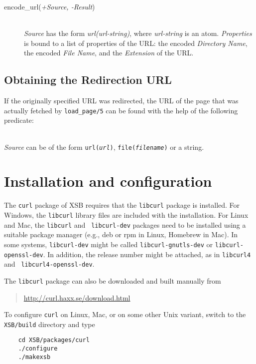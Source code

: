 \begin{description}
\item[encode\_url({\it +Source, -Result})]\mbox{}
  \\
{\it Source} has the form {\it url(url-string)}, where
\emph{url-string} is an atom.
{\it Properties} is bound to a list of properties of the URL:
the encoded {\it Directory Name}, the encoded {\it File Name}, and the {\it
  Extension} of the URL.

\end{description}

\subsection{Obtaining the Redirection URL}

If the originally specified URL was redirected, the URL of the page that
was actually fetched by {\tt load\_page/5} can be found with the help of
the following predicate: 

\begin{description}
\item[get\_redir\_url({\it +Source, -UrlNew})]\mbox{}
  \\
  {\it Source} can be of the form {\tt url({\it {url}})}, {\tt file({\it {filename}})} or a string.

\end{description}

\section{Installation and configuration}

The {\tt curl} package of XSB requires that the {\tt libcurl} package is
installed.  For Windows, the {\tt libcurl} library files are included with
the installation. For Linux and Mac, the {\tt libcurl} and {\tt
  libcurl-dev} packages need to be installed using a suitable
package manager (e.g., deb or rpm in Linux, Homebrew in Mac). In some
systems, {\tt libcurl-dev} might be
called {\tt libcurl-gnutls-dev} or {\tt libcurl-openssl-dev}.  In addition,
the release number might be attached, as in {\tt libcurl4} and {\tt
  libcurl4-openssl-dev}.

The {\tt libcurl} package can also be downloaded and
built manually from
\begin{quote}
  \url{http://curl.haxx.se/download.html} 
\end{quote}
To configure {\tt curl} on Linux, Mac, or on some other Unix variant,
switch to the {\tt XSB/build} directory and type

\begin{verbatim}
    cd XSB/packages/curl
    ./configure
    ./makexsb
\end{verbatim}

